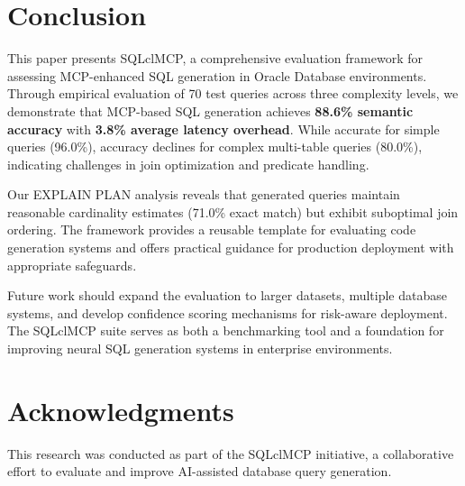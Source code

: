 \documentclass[11pt,a4paper]{article}
\begin{document}
\section{Conclusion}

This paper presents SQLclMCP, a comprehensive evaluation framework for assessing MCP-enhanced SQL generation in Oracle Database environments. Through empirical evaluation of 70 test queries across three complexity levels, we demonstrate that MCP-based SQL generation achieves \textbf{88.6\% semantic accuracy} with \textbf{3.8\% average latency overhead}. While accurate for simple queries (96.0\%), accuracy declines for complex multi-table queries (80.0\%), indicating challenges in join optimization and predicate handling.

Our EXPLAIN PLAN analysis reveals that generated queries maintain reasonable cardinality estimates (71.0\% exact match) but exhibit suboptimal join ordering. The framework provides a reusable template for evaluating code generation systems and offers practical guidance for production deployment with appropriate safeguards.

Future work should expand the evaluation to larger datasets, multiple database systems, and develop confidence scoring mechanisms for risk-aware deployment. The SQLclMCP suite serves as both a benchmarking tool and a foundation for improving neural SQL generation systems in enterprise environments.

\section*{Acknowledgments}

This research was conducted as part of the SQLclMCP initiative, a collaborative effort to evaluate and improve AI-assisted database query generation.
\end{document}
